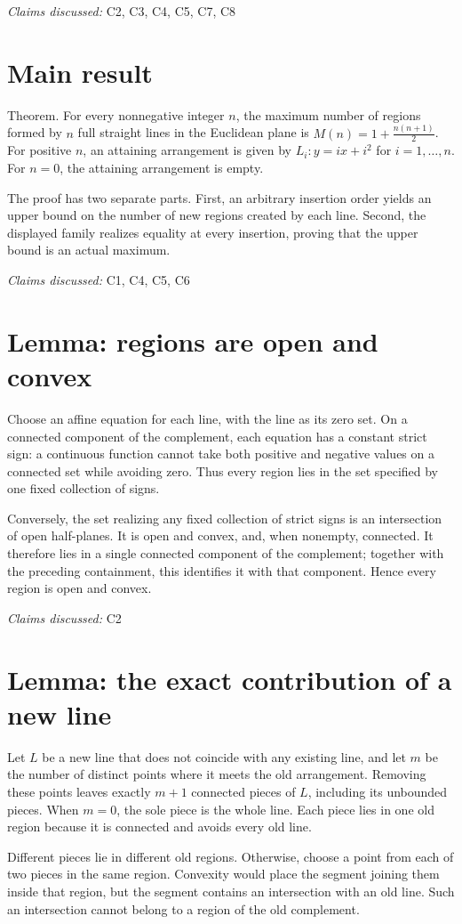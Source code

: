 \documentclass[11pt]{article}
\begin{document}
\textit{Claims discussed: }C2, C3, C4, C5, C7, C8
\section{Main result}
Theorem. For every nonnegative integer $n$, the maximum number of regions formed by $n$ full straight lines in the Euclidean plane is
$M(n)=1+\frac{n(n+1)}{2}$. For positive $n$, an attaining arrangement is given by $L_i: y=ix+i^2$ for $i=1,\ldots,n$. For $n=0$, the attaining arrangement is empty.

The proof has two separate parts. First, an arbitrary insertion order yields an upper bound on the number of new regions created by each line. Second, the displayed family realizes equality at every insertion, proving that the upper bound is an actual maximum.

\textit{Claims discussed: }C1, C4, C5, C6
\section{Lemma: regions are open and convex}
Choose an affine equation for each line, with the line as its zero set. On a connected component of the complement, each equation has a constant strict sign: a continuous function cannot take both positive and negative values on a connected set while avoiding zero. Thus every region lies in the set specified by one fixed collection of signs.

Conversely, the set realizing any fixed collection of strict signs is an intersection of open half-planes. It is open and convex, and, when nonempty, connected. It therefore lies in a single connected component of the complement; together with the preceding containment, this identifies it with that component. Hence every region is open and convex.

\textit{Claims discussed: }C2
\section{Lemma: the exact contribution of a new line}
Let $L$ be a new line that does not coincide with any existing line, and let $m$ be the number of distinct points where it meets the old arrangement. Removing these points leaves exactly $m+1$ connected pieces of $L$, including its unbounded pieces. When $m=0$, the sole piece is the whole line. Each piece lies in one old region because it is connected and avoids every old line.

Different pieces lie in different old regions. Otherwise, choose a point from each of two pieces in the same region. Convexity would place the segment joining them inside that region, but the segment contains an intersection with an old line. Such an intersection cannot belong to a region of the old complement.
\end{document}
